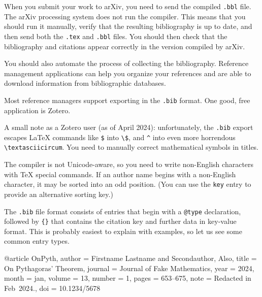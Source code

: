 \begin{remark}
When you submit your work to arXiv, you need to send the compiled \verb|.bbl| file.
The arXiv processing system does not run the  compiler.
This means that you should run it manually,
verify that the resulting bibliography is up to date,
and then send both the \verb|.tex| and \verb|.bbl| files.
You should then check that the bibliography and citations
appear correctly in the version compiled by arXiv.
\end{remark}

\begin{practices}
You should also automate the process of collecting the bibliography.
Reference management applications can help you organize your references
and are able to download information from bibliographic databases.

Most reference managers support exporting in the \verb|.bib| format.
One good, free application is Zotero\footnotemark.

A small note as a Zotero user (as of April 2024):
unfortunately, the \verb|.bib| export escapes \LaTeX{} commands like \verb|$| into \verb|\$|,
and \verb|^| into even more horrendous \verb|\textasciicircum|.
You need to manually correct mathematical symbols in titles.
\end{practices}

\begin{gotcha}
The  compiler is not Unicode-aware,
so you need to write non-English characters with \TeX{} special commands.
If an author name begins with a non-English character,
it may be sorted into an odd position.
(You can use the \verb|key| entry to provide an alternative sorting key.)
\end{gotcha}

The \verb|.bib| file format consists of entries that begin with a \verb|@type| declaration,
followed by \verb|{}| that contains the citation key
and further data in key-value format.
This is probably easiest to explain with examples,
so let us see some common entry types.

\begin{ExampleCode}
@article {OnPyth,
    author = {Firstname Lastname and Secondauthor, Also},
    title = {On {Pythagoras'} Theorem},
    journal = {Journal of Fake Mathematics},
    year = {2024},
    month = {jan},
    volume = {13},
    number = {1},
    pages = {653--675},
    note = {Redacted in Feb~2024.},
    doi = {10.1234/5678}
}
\end{ExampleCode}

